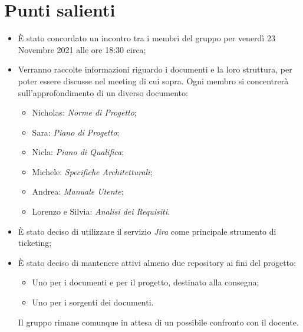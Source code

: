 \documentclass[11pt]{article}
\begin{document}
	\newpage

	\section{Punti salienti}
		\begin{itemize}
			\item È stato concordato un incontro tra i membri del gruppo per venerdì 23 Novembre 2021 alle ore 18:30 circa;
			\item Verranno raccolte informazioni riguardo i documenti e la loro struttura, per poter essere discusse nel
			meeting di cui sopra. Ogni membro si concentrerà sull'approfondimento di un diverso documento:
			\begin{itemize}
				\item Nicholas: \textit{Norme di Progetto};
				\item Sara: \textit{Piano di Progetto};
				\item Nicla: \textit{Piano di Qualifica};
				\item Michele: \textit{Specifiche Architetturali};
				\item Andrea: \textit{Manuale Utente};
				\item Lorenzo e Silvia: \textit{Analisi dei Requisiti}.
			\end{itemize}
			\item È stato deciso di utilizzare il servizio \textit{Jira} come principale strumento di ticketing;
			\item È stato deciso di mantenere attivi almeno due repository ai fini del progetto:
			\begin{itemize}
				\item Uno per i documenti e per il progetto, destinato alla consegna;
				\item Uno per i sorgenti dei documenti.
			\end{itemize}
			Il gruppo rimane comunque in attesa di un possibile confronto con il docente.
		\end{itemize}
\end{document}
